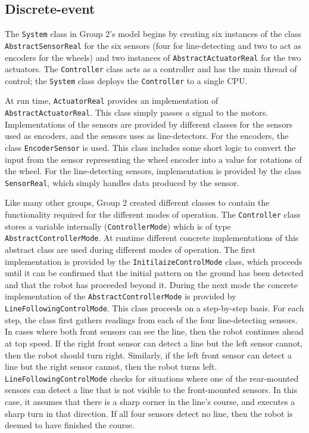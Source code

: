 \subsection{Discrete-event}
The \texttt{System} class in Group 2's model begins by creating six
instances of the class \texttt{Abstract\-Sen\-sor\-Real} for the six
sensors (four for line-detecting and two to act as encoders for the
wheels) and two instances of \texttt{AbstractActuatorReal} for the two
actuators.  The \texttt{Controller} class acts as a controller and has
the main thread of control; the \texttt{System} class deploys the
\texttt{Controller} to a single CPU.

At run time, \texttt{ActuatorReal} provides an implementation of
\texttt{AbstractActuatorReal}.  This class simply passes a signal to
the motors.  Implementations of the sensors are provided by different
classes for the sensors used as encoders, and the sensors uses as
line-detectors.  For the encoders, the class \texttt{EncoderSensor} is
used.  This class includes some short logic to convert the input from
the sensor representing the wheel encoder into a value for rotations
of the wheel.  For the line-detecting sensors, implementation is
provided by the class \texttt{SensorReal}, which simply handles data
produced by the sensor.

Like many other groups, Group 2 created different classes to contain
the functionality required for the different modes of operation.  The
\texttt{Controller} class stores a variable internally
(\texttt{ControllerMode}) which is of type
\texttt{AbstractControllerMode}.  At runtime different concrete
implementations of this abstract class are used during different modes
of operation.  The first implementation is provided by the
\texttt{InitilaizeControlMode} class, which proceeds until it can be
confirmed that the initial pattern on the ground has been detected and
that the robot has proceeded beyond it.  During the next mode the
concrete implementation of the \texttt{AbstractControllerMode} is
provided by \texttt{LineFollowingControlMode}.  This class proceeds on
a step-by-step basis.  For each step, the class first gathers readings
from each of the four line-detecting sensors.  In cases where both
front sensors can see the line, then the robot continues ahead at top
speed.  If the right front sensor can detect a line but the left
sensor cannot, then the robot should turn right.  Similarly, if the
left front sensor can detect a line but the right sensor cannot, then
the robot turns left.  \texttt{LineFollowingControlMode} checks for
situations where one of the rear-mounted sensors can detect a line
that is not visible to the front-mounted sensors.  In this case, it
assumes that there is a sharp corner in the line's course, and
executes a sharp turn in that direction.  If all four sensors detect
no line, then the robot is deemed to have finished the course.

